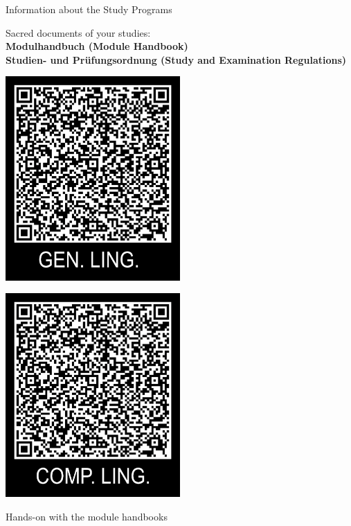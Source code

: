 \documentclass[aspectratio=169,hyperref={unicode},xcolor={dvipsnames}]{beamer}
\begin{document}
\begin{frame}{Information about the Study Programs}
\begin{center} Sacred documents of your studies:\\\large \textbf{Modulhandbuch (Module Handbook)\\Studien- und Prüfungsordnung (Study and Examination Regulations)}
\vfill

\begin{minipage}{0.4\textwidth}
\centering
    \includegraphics[width=0.5\textwidth]{../QRtemplate_2.png}
  \end{minipage}
  \hfill
  \begin{minipage}{0.4\textwidth}
  \centering
    \includegraphics[width=0.5\textwidth]{../QRtemplate_3.png}
  \end{minipage}
\end{center}

\end{frame}
\begin{frame}
	\centering \huge Hands-on with the module handbooks
\end{frame}
\end{document}
